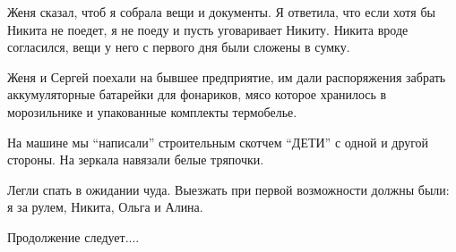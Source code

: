 Женя сказал, чтоб я собрала вещи и документы. Я ответила, что если хотя бы
Никита не поедет, я не поеду и пусть уговаривает Никиту. Никита вроде
согласился, вещи у него с первого дня были сложены в сумку. 

Женя и Сергей поехали на бывшее предприятие,  им дали распоряжения забрать
аккумуляторные батарейки для фонариков, мясо которое хранилось в морозильнике и
упакованные комплекты термобелье. 

На машине мы \enquote{написали} строительным скотчем \enquote{ДЕТИ} с одной и другой стороны. На
зеркала навязали белые тряпочки. 

Легли спать в ожидании чуда. Выезжать при первой возможности должны были: я за
рулем, Никита, Ольга и Алина. 

Продолжение следует....
